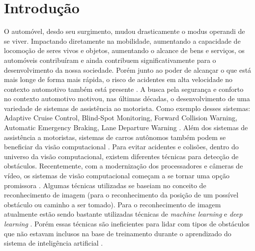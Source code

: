 \chapter{Introdução}

O automóvel, desdo seu surgimento, mudou drasticamente o modus operandi de se viver. Impactando diretamente na mobilidade, aumentando a capacidade de locomoção de seres vivos e objetos, aumentando o alcance de bens e serviços, os automóveis contribuíram e ainda contribuem significativamente para o desenvolvimento da nossa sociedade. Porém junto ao poder de alcançar o que está mais longe de forma mais rápida, o risco de acidentes em alta velocidade no contexto automotivo também está presente \cite{Malik2008}.
A busca pela segurança e conforto no contexto automotivo motivou, nas últimas décadas, o desenvolvimento de uma variedade de sistemas de assistência ao motorista. Como exemplo desses sistemas: Adaptive  Cruise  Control, Blind-Spot  Monitoring, Forward Collision Warning, Automatic Emergency Braking, Lane Departure Warning \cite{tsai2018}. Além dos sistemas de assistência a motoristas, sistemas de carros autônomos também podem se beneficiar da visão computacional \cite{Gehrig1999}. 
Para evitar acidentes e colisões, dentro do universo da visão computacional, existem diferentes técnicas para detecção de obstáculos. Recentemente, com a modernização dos processadores e câmeras de vídeo, os sistemas de visão computacional começam a se tornar uma opção promissora \cite{tsai2018}. Algumas técnicas utilizadas se baseiam no conceito de reconhecimento de imagem (para o reconhecimento da posição de um possível obstáculo ou caminho a ser tomado). Para o reconhecimento de imagem atualmente estão sendo bastante utilizadas técnicas de \textit{machine learning}\cite{Shanmugasundaram2018} e \textit{deep learning} \cite{Wang2018}. Porém essas técnicas são ineficientes para lidar com tipos de obstáculos que não estavam inclusos na base de treinamento durante o aprendizado do sistema de inteligência artificial \cite{tsai2018}. 

